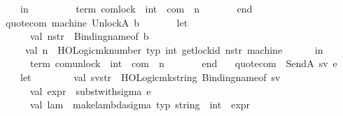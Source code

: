 \begin{isabellebody}
\ \ \ \ \ \ in\ \isanewline
\ \ \ \ \ \ \ \ {\isacharat}{\kern0pt}{\isacharbraceleft}{\kern0pt}term\ {\isachardoublequote}{\kern0pt}com{\isachardot}{\kern0pt}lock\ {\isacharcolon}{\kern0pt}{\isacharcolon}{\kern0pt}\ int\ {\isasymRightarrow}\ com{\isachardoublequote}{\kern0pt}{\isacharbraceright}{\kern0pt}\ {\isachardollar}{\kern0pt}\ n\ \isanewline
\ \ \ \ \ \ end\isanewline
\ \ {\isacharbar}{\kern0pt}\ quote{\isacharunderscore}{\kern0pt}com\ machine\ {\isacharparenleft}{\kern0pt}UnlockA\ b{\isacharparenright}{\kern0pt}\ {\isacharequal}{\kern0pt}\isanewline
\ \ \ \ \ \ let\ \isanewline
\ \ \ \ \ \ \ \ val\ n{\isacharunderscore}{\kern0pt}str\ {\isacharequal}{\kern0pt}\ Binding{\isachardot}{\kern0pt}name{\isacharunderscore}{\kern0pt}of\ b\isanewline
\ \ \ \ \ \ \ val\ n\ {\isacharequal}{\kern0pt}\ HOLogic{\isachardot}{\kern0pt}mk{\isacharunderscore}{\kern0pt}number\ {\isacharat}{\kern0pt}{\isacharbraceleft}{\kern0pt}typ\ int{\isacharbraceright}{\kern0pt}\ {\isacharparenleft}{\kern0pt}get{\isacharunderscore}{\kern0pt}lock{\isacharunderscore}{\kern0pt}id\ n{\isacharunderscore}{\kern0pt}str\ machine{\isacharparenright}{\kern0pt}\isanewline
\ \ \ \ \ \ in\ \isanewline
\ \ \ \ \ \ \ \ {\isacharat}{\kern0pt}{\isacharbraceleft}{\kern0pt}term\ {\isachardoublequote}{\kern0pt}com{\isachardot}{\kern0pt}unlock\ {\isacharcolon}{\kern0pt}{\isacharcolon}{\kern0pt}\ int\ {\isasymRightarrow}\ com{\isachardoublequote}{\kern0pt}{\isacharbraceright}{\kern0pt}\ {\isachardollar}{\kern0pt}\ n\ \isanewline
\ \ \ \ \ \ end\isanewline
\ \ {\isacharbar}{\kern0pt}\ quote{\isacharunderscore}{\kern0pt}com\ {\isacharunderscore}{\kern0pt}\ {\isacharparenleft}{\kern0pt}SendA\ {\isacharparenleft}{\kern0pt}sv{\isacharcomma}{\kern0pt}\ e{\isacharparenright}{\kern0pt}{\isacharparenright}{\kern0pt}\ {\isacharequal}{\kern0pt}\isanewline
\ \ \ \ \ \ let\isanewline
\ \ \ \ \ \ \ \ val\ sv{\isacharunderscore}{\kern0pt}str\ {\isacharequal}{\kern0pt}\ HOLogic{\isachardot}{\kern0pt}mk{\isacharunderscore}{\kern0pt}string\ {\isacharparenleft}{\kern0pt}Binding{\isachardot}{\kern0pt}name{\isacharunderscore}{\kern0pt}of\ sv{\isacharparenright}{\kern0pt}\isanewline
\ \ \ \ \ \ \ \ val\ expr\ {\isacharequal}{\kern0pt}\ subst{\isacharunderscore}{\kern0pt}with{\isacharunderscore}{\kern0pt}sigma\ e\ \isanewline
\ \ \ \ \ \ \ \ val\ lam\ {\isacharequal}{\kern0pt}\ make{\isacharunderscore}{\kern0pt}lambda{\isacharunderscore}{\kern0pt}sigma\ {\isacharat}{\kern0pt}{\isacharbraceleft}{\kern0pt}typ\ {\isachardoublequote}{\kern0pt}string\ {\isasymRightarrow}\ int{\isachardoublequote}{\kern0pt}{\isacharbraceright}{\kern0pt}\ {\isachardoublequote}{\kern0pt}{\isasymsigma}{\isachardoublequote}{\kern0pt}\ expr\isanewline

\end{isabellebody}
